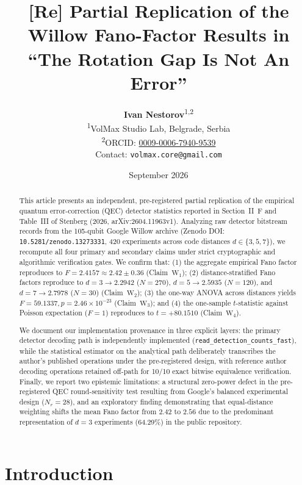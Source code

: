 \documentclass[10pt,a4paper,onecolumn]{article}
\title{\textbf{[Re] Partial Replication of the Willow Fano-Factor Results in ``The Rotation Gap Is Not An Error''}}
\author{
  \textbf{Ivan Nestorov}\textsuperscript{1,2}\\
  \small\textsuperscript{1}VolMax Studio Lab, Belgrade, Serbia\\
  \small\textsuperscript{2}ORCID: \href{https://orcid.org/0009-0006-7940-9539}{0009-0006-7940-9539}\\
  \small Contact: \texttt{volmax.core@gmail.com}
}
\date{September 2026}
\begin{document}
\maketitle

\begin{abstract}
This article presents an independent, pre-registered partial replication of the empirical quantum error-correction (QEC) detector statistics reported in Section~II~F and Table~III of Stenberg (2026, arXiv:2604.11963v1). Analyzing raw detector bitstream records from the 105-qubit Google Willow archive (Zenodo DOI: \texttt{10.5281/zenodo.13273331}, 420 experiments across code distances $d \in \{3, 5, 7\}$), we recompute all four primary and secondary claims under strict cryptographic and algorithmic verification gates. We confirm that: (1) the aggregate empirical Fano factor reproduces to $F = 2.4157 \approx 2.42 \pm 0.36$ (Claim~$\text{W}_1$); (2) distance-stratified Fano factors reproduce to $d=3 \to 2.2942$ ($N=270$), $d=5 \to 2.5935$ ($N=120$), and $d=7 \to 2.7978$ ($N=30$) (Claim~$\text{W}_2$); (3) the one-way ANOVA across distances yields $F = 59.1337, p = 2.46 \times 10^{-23}$ (Claim~$\text{W}_3$); and (4) the one-sample $t$-statistic against Poisson expectation ($F=1$) reproduces to $t = +80.1510$ (Claim~$\text{W}_4$).

We document our implementation provenance in three explicit layers: the primary detector decoding path is independently implemented (\texttt{read\_detection\_counts\_fast}), while the statistical estimator on the analytical path deliberately transcribes the author's published operations under the pre-registered design, with reference author decoding operations retained off-path for 10/10 exact bitwise equivalence verification. Finally, we report two epistemic limitations: a structural zero-power defect in the pre-registered QEC round-sensitivity test resulting from Google's balanced experimental design ($N_r = 28$), and an exploratory finding demonstrating that equal-distance weighting shifts the mean Fano factor from $2.42$ to $2.56$ due to the predominant representation of $d=3$ experiments (64.29\%) in the public repository.
\end{abstract}

\section{Introduction}
\end{document}

